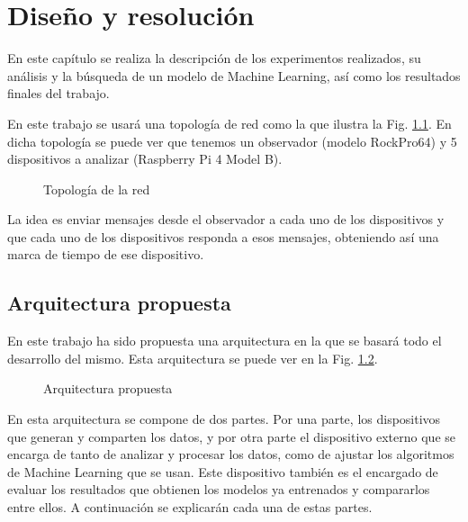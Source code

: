 
\chapter{Diseño y resolución} \label{chap:diseno}

En este capítulo se realiza la descripción de los experimentos realizados, su análisis y la búsqueda de un modelo de Machine Learning, así como los resultados finales del trabajo.

En este trabajo se usará una topología de red como la que ilustra la Fig. \ref{fig:top}. En dicha topología se puede ver que tenemos un observador (modelo RockPro64) y 5 dispositivos a analizar (Raspberry Pi 4 Model B).

\begin{figure}[htpb!]
    \centering
    \resizebox{0.7\textwidth}{!}{
        
    }
    \caption{Topología de la red}
    \label{fig:top}
\end{figure}

La idea es enviar mensajes desde el observador a cada uno de los dispositivos y que cada uno de los dispositivos responda a esos mensajes, obteniendo así una marca de tiempo de ese dispositivo.

\section{Arquitectura propuesta}

En este trabajo ha sido propuesta una arquitectura en la que se basará todo el desarrollo del mismo. Esta arquitectura se puede ver en la Fig. \ref{fig:architecture}.

\begin{figure}
    \centering
    
    \caption{Arquitectura propuesta}
    \label{fig:architecture}
\end{figure}

En esta arquitectura se compone de dos partes. Por una parte, los dispositivos que generan y comparten los datos, y por otra parte el dispositivo externo que se encarga de tanto de analizar y procesar los datos, como de ajustar los algoritmos de Machine Learning que se usan. Este dispositivo también es el encargado de evaluar los resultados que obtienen los modelos ya entrenados y compararlos entre ellos. A continuación se explicarán cada una de estas partes.

